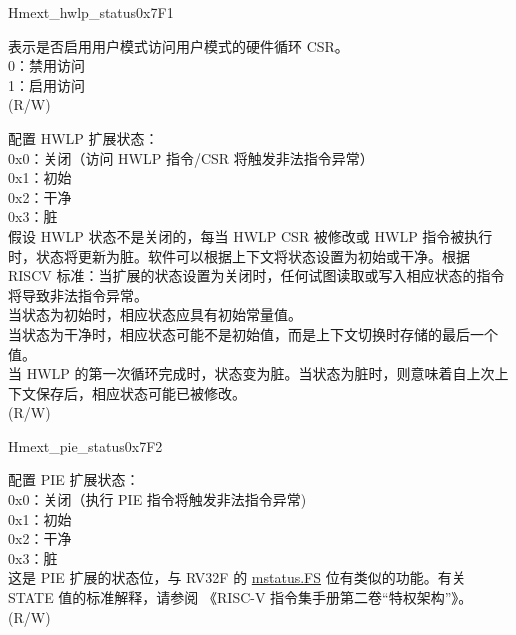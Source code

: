 \begin{register}{H}{mext\_hwlp\_status}{0x7F1}\label{regdesc:MEXT_HWLP_STATUS}%
%
%
%
\regnewline%
\begin{regdesc}\begin{reglist}
\label{fielddesc:MEXT_HWLP_URW}\item [URW] 表示是否启用用户模式访问用户模式的硬件循环 CSR。\\
0：禁用访问\\
1：启用访问\\
(R/W)
\label{fielddesc:MEXT_HWLP_STATE}\item [STATE] 配置 HWLP 扩展状态：\\
0x0：关闭（访问 HWLP 指令/CSR 将触发非法指令异常）\\
0x1：初始 \\
0x2：干净 \\
0x3：脏 \\
假设 HWLP 状态不是关闭的，每当 HWLP CSR 被修改或 HWLP 指令被执行时，状态将更新为脏。软件可以根据上下文将状态设置为初始或干净。根据 RISCV 标准：当扩展的状态设置为关闭时，任何试图读取或写入相应状态的指令将导致非法指令异常。\\
当状态为初始时，相应状态应具有初始常量值。\\
当状态为干净时，相应状态可能不是初始值，而是上下文切换时存储的最后一个值。\\
当 HWLP 的第一次循环完成时，状态变为脏。当状态为脏时，则意味着自上次上下文保存后，相应状态可能已被修改。\\
(R/W)
\end{reglist}\end{regdesc}
\end{register}

\begin{register}{H}{mext\_pie\_status}{0x7F2}\label{regdesc:MEXT_PIE_STATUS}%
%
%
\regnewline%
\begin{regdesc}\begin{reglist}
\label{fielddesc:MEXT_PIE_STATE}\item [STATE] 配置 PIE 扩展状态：\\
0x0：关闭（执行 PIE 指令将触发非法指令异常) \\
0x1：初始 \\
0x2：干净 \\
0x3：脏 \\
这是 PIE 扩展的状态位，与 RV32F 的 \hyperref[fielddesc:MSTATUS_FS]{mstatus.FS} 位有类似的功能。有关 STATE 值的标准解释，请参阅 《RISC-V 指令集手册第二卷“特权架构”》。\\
(R/W)
\end{reglist}\end{regdesc}
\end{register}


